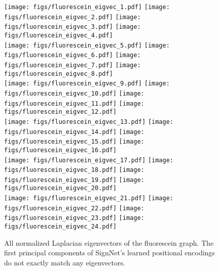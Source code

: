 \documentclass{article} \usepackage{iclr2023_conference,times}
\begin{document}
\begin{figure}[ht]
    \newcommand{\wth}{.2}
    \centering
    \texttt{[image: figs/fluorescein\_eigvec\_1.pdf]}
    \texttt{[image: figs/fluorescein\_eigvec\_2.pdf]}
    \texttt{[image: figs/fluorescein\_eigvec\_3.pdf]}
    \texttt{[image: figs/fluorescein\_eigvec\_4.pdf]} \\
    \texttt{[image: figs/fluorescein\_eigvec\_5.pdf]}
    \texttt{[image: figs/fluorescein\_eigvec\_6.pdf]}
    \texttt{[image: figs/fluorescein\_eigvec\_7.pdf]}
    \texttt{[image: figs/fluorescein\_eigvec\_8.pdf]} \\
    \texttt{[image: figs/fluorescein\_eigvec\_9.pdf]}
    \texttt{[image: figs/fluorescein\_eigvec\_10.pdf]}
    \texttt{[image: figs/fluorescein\_eigvec\_11.pdf]}
    \texttt{[image: figs/fluorescein\_eigvec\_12.pdf]} \\
    \texttt{[image: figs/fluorescein\_eigvec\_13.pdf]}
    \texttt{[image: figs/fluorescein\_eigvec\_14.pdf]}
    \texttt{[image: figs/fluorescein\_eigvec\_15.pdf]}
    \texttt{[image: figs/fluorescein\_eigvec\_16.pdf]} \\
     \texttt{[image: figs/fluorescein\_eigvec\_17.pdf]}
    \texttt{[image: figs/fluorescein\_eigvec\_18.pdf]}
    \texttt{[image: figs/fluorescein\_eigvec\_19.pdf]}
    \texttt{[image: figs/fluorescein\_eigvec\_20.pdf]} \\
     \texttt{[image: figs/fluorescein\_eigvec\_21.pdf]}
    \texttt{[image: figs/fluorescein\_eigvec\_22.pdf]}
    \texttt{[image: figs/fluorescein\_eigvec\_23.pdf]}
    \texttt{[image: figs/fluorescein\_eigvec\_24.pdf]} 
    \caption{All normalized Laplacian eigenvectors of the fluorescein graph. The first principal components of SignNet's learned positional encodings do not exactly match any eigenvectors.}
    
    \label{fig:fluorescein_eigvec}
\end{figure}
\end{document}
